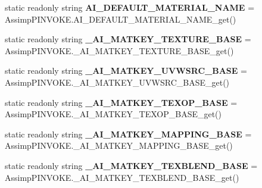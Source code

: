 \begin{DoxyCompactItemize}
\item 
\hypertarget{class_assimp_a801febef7b1a09e4c254c4dfafdbd887}{static readonly string {\bfseries A\+I\+\_\+\+D\+E\+F\+A\+U\+L\+T\+\_\+\+M\+A\+T\+E\+R\+I\+A\+L\+\_\+\+N\+A\+M\+E} = Assimp\+P\+I\+N\+V\+O\+K\+E.\+A\+I\+\_\+\+D\+E\+F\+A\+U\+L\+T\+\_\+\+M\+A\+T\+E\+R\+I\+A\+L\+\_\+\+N\+A\+M\+E\+\_\+get()}\label{class_assimp_a801febef7b1a09e4c254c4dfafdbd887}

\item 
\hypertarget{class_assimp_af1f077e32820d289930ea9a453359058}{static readonly string {\bfseries \+\_\+\+A\+I\+\_\+\+M\+A\+T\+K\+E\+Y\+\_\+\+T\+E\+X\+T\+U\+R\+E\+\_\+\+B\+A\+S\+E} = Assimp\+P\+I\+N\+V\+O\+K\+E.\+\_\+\+A\+I\+\_\+\+M\+A\+T\+K\+E\+Y\+\_\+\+T\+E\+X\+T\+U\+R\+E\+\_\+\+B\+A\+S\+E\+\_\+get()}\label{class_assimp_af1f077e32820d289930ea9a453359058}

\item 
\hypertarget{class_assimp_a36d6db2d6075657ba3441246e971722b}{static readonly string {\bfseries \+\_\+\+A\+I\+\_\+\+M\+A\+T\+K\+E\+Y\+\_\+\+U\+V\+W\+S\+R\+C\+\_\+\+B\+A\+S\+E} = Assimp\+P\+I\+N\+V\+O\+K\+E.\+\_\+\+A\+I\+\_\+\+M\+A\+T\+K\+E\+Y\+\_\+\+U\+V\+W\+S\+R\+C\+\_\+\+B\+A\+S\+E\+\_\+get()}\label{class_assimp_a36d6db2d6075657ba3441246e971722b}

\item 
\hypertarget{class_assimp_afbbe7b1f79d444305e58234f24d82cda}{static readonly string {\bfseries \+\_\+\+A\+I\+\_\+\+M\+A\+T\+K\+E\+Y\+\_\+\+T\+E\+X\+O\+P\+\_\+\+B\+A\+S\+E} = Assimp\+P\+I\+N\+V\+O\+K\+E.\+\_\+\+A\+I\+\_\+\+M\+A\+T\+K\+E\+Y\+\_\+\+T\+E\+X\+O\+P\+\_\+\+B\+A\+S\+E\+\_\+get()}\label{class_assimp_afbbe7b1f79d444305e58234f24d82cda}

\item 
\hypertarget{class_assimp_ac14686abc3ae1baa0f532e5e3e28c6ad}{static readonly string {\bfseries \+\_\+\+A\+I\+\_\+\+M\+A\+T\+K\+E\+Y\+\_\+\+M\+A\+P\+P\+I\+N\+G\+\_\+\+B\+A\+S\+E} = Assimp\+P\+I\+N\+V\+O\+K\+E.\+\_\+\+A\+I\+\_\+\+M\+A\+T\+K\+E\+Y\+\_\+\+M\+A\+P\+P\+I\+N\+G\+\_\+\+B\+A\+S\+E\+\_\+get()}\label{class_assimp_ac14686abc3ae1baa0f532e5e3e28c6ad}

\item 
\hypertarget{class_assimp_a766445aa07d7af3aec30aea407692063}{static readonly string {\bfseries \+\_\+\+A\+I\+\_\+\+M\+A\+T\+K\+E\+Y\+\_\+\+T\+E\+X\+B\+L\+E\+N\+D\+\_\+\+B\+A\+S\+E} = Assimp\+P\+I\+N\+V\+O\+K\+E.\+\_\+\+A\+I\+\_\+\+M\+A\+T\+K\+E\+Y\+\_\+\+T\+E\+X\+B\+L\+E\+N\+D\+\_\+\+B\+A\+S\+E\+\_\+get()}\label{class_assimp_a766445aa07d7af3aec30aea407692063}


\end{DoxyCompactItemize}
